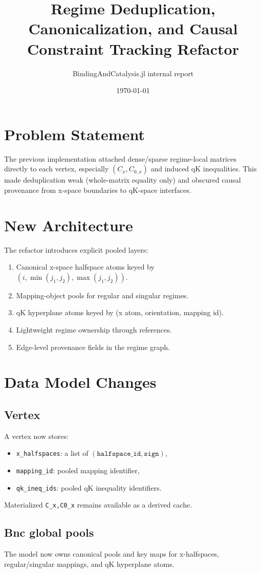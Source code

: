 \documentclass[11pt]{article}
\title{Regime Deduplication, Canonicalization, and Causal Constraint Tracking Refactor}
\author{BindingAndCatalysis.jl internal report}
\date{\today}
\begin{document}
\maketitle

\section{Problem Statement}
The previous implementation attached dense/sparse regime-local matrices directly to each vertex, especially $(C_x,C_{0,x})$ and induced qK inequalities. This made deduplication weak (whole-matrix equality only) and obscured causal provenance from x-space boundaries to qK-space interfaces.

\section{New Architecture}
The refactor introduces explicit pooled layers:
\begin{enumerate}
  \item Canonical x-space halfspace atoms keyed by $(i,\min(j_1,j_2),\max(j_1,j_2))$.
  \item Mapping-object pools for regular and singular regimes.
  \item qK hyperplane atoms keyed by (x atom, orientation, mapping id).
  \item Lightweight regime ownership through references.
  \item Edge-level provenance fields in the regime graph.
\end{enumerate}

\section{Data Model Changes}
\subsection{Vertex}
A vertex now stores:
\begin{itemize}
  \item \texttt{x\_halfspaces}: a list of \((\texttt{halfspace\_id},\texttt{sign})\),
  \item \texttt{mapping\_id}: pooled mapping identifier,
  \item \texttt{qk\_ineq\_ids}: pooled qK inequality identifiers.
\end{itemize}
Materialized \texttt{C\_x,C0\_x} remains available as a derived cache.

\subsection{Bnc global pools}
The model now owns canonical pools and key maps for x-halfspaces, regular/singular mappings, and qK hyperplane atoms.
\end{document}
